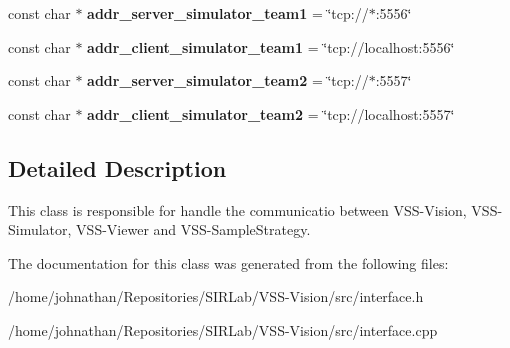 \begin{DoxyCompactItemize}
\item 
const char $\ast$ {\bfseries addr\+\_\+server\+\_\+simulator\+\_\+team1} = \char`\"{}tcp\+://$\ast$\+:5556\char`\"{}\hypertarget{classInterface_a4315a24cd5d7156ccb6da180cc5a825e}{}\label{classInterface_a4315a24cd5d7156ccb6da180cc5a825e}

\item 
const char $\ast$ {\bfseries addr\+\_\+client\+\_\+simulator\+\_\+team1} = \char`\"{}tcp\+://localhost\+:5556\char`\"{}\hypertarget{classInterface_aa05d667c54fc41c5dc6fe7aa8a85ef5d}{}\label{classInterface_aa05d667c54fc41c5dc6fe7aa8a85ef5d}

\item 
const char $\ast$ {\bfseries addr\+\_\+server\+\_\+simulator\+\_\+team2} = \char`\"{}tcp\+://$\ast$\+:5557\char`\"{}\hypertarget{classInterface_ae358e6d8cb691934a5dc23c4a718082b}{}\label{classInterface_ae358e6d8cb691934a5dc23c4a718082b}

\item 
const char $\ast$ {\bfseries addr\+\_\+client\+\_\+simulator\+\_\+team2} = \char`\"{}tcp\+://localhost\+:5557\char`\"{}\hypertarget{classInterface_adad17a36b3382235441861a3648bd807}{}\label{classInterface_adad17a36b3382235441861a3648bd807}

\end{DoxyCompactItemize}


\subsection{Detailed Description}
This class is responsible for handle the communicatio between V\+S\+S-\/\+Vision, V\+S\+S-\/\+Simulator, V\+S\+S-\/\+Viewer and V\+S\+S-\/\+Sample\+Strategy. 

The documentation for this class was generated from the following files\+:\begin{DoxyCompactItemize}
\item 
/home/johnathan/\+Repositories/\+S\+I\+R\+Lab/\+V\+S\+S-\/\+Vision/src/interface.\+h\item 
/home/johnathan/\+Repositories/\+S\+I\+R\+Lab/\+V\+S\+S-\/\+Vision/src/interface.\+cpp\end{DoxyCompactItemize}
